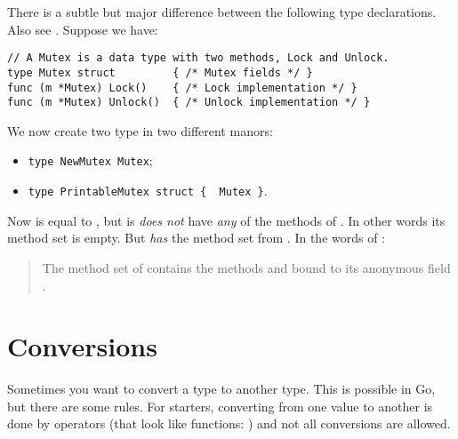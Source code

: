 There is a subtle but major difference between the following type
declarations. Also see \cite[section~"Type Declarations"]{go_spec}.
Suppose we have:
\begin{lstlisting}
// A Mutex is a data type with two methods, Lock and Unlock.
type Mutex struct         { /* Mutex fields */ }
func (m *Mutex) Lock()    { /* Lock implementation */ }
func (m *Mutex) Unlock()  { /* Unlock implementation */ }
\end{lstlisting}
We now create two type in two different manors:
\begin{itemize}
\item \lstinline|type NewMutex Mutex|;
\item \lstinline|type PrintableMutex struct {  Mutex }|.
\end{itemize}
Now  is equal to , but
is \emph{does not} have \emph{any} of the methods of . In other words
its method set is empty.
But  \emph{has}  the 
method set from .
In the words of \cite{go_spec}:
\begin{quote}
The method set of  contains the methods
 and  bound to its anonymous field .
\end{quote}

\section{Conversions}
\label{sec:conversions}
Sometimes you want to convert a type to another type. 
This is possible in Go, but
there are some rules. For starters, converting from one value to another
is done by operators (that look like functions: ) and not all conversions are allowed.

\begin{table}[H]
\begin{center}
\caption[Valid conversions]{Valid conversions, 
\lstinline{float64} works the same as \lstinline{float32}}
\label{tab:convesion}

\end{center}
\end{table}

